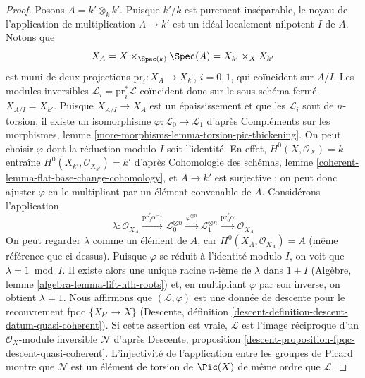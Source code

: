 \begin{proof}
\medskip\noindent
Posons $A = k' \otimes_k k'$. Puisque $k'/k$ est purement inséparable,
le noyau de l'application de multiplication $A \to k'$ est un
idéal localement nilpotent $I$ de $A$. Notons que
$$
X_A = X \times_{\Spec(k)} \Spec(A) = X_{k'} \times_X X_{k'}
$$
est muni de deux projections $\text{pr}_i : X_A \to X_{k'}$, $i = 0, 1$,
qui coïncident sur $A/I$. Les modules inversibles
$\mathcal{L}_i = \text{pr}_i^*\mathcal{L}$
coïncident donc sur le sous-schéma fermé $X_{A/I} = X_{k'}$.
Puisque $X_{A/I} \to X_A$ est un épaississement et que
les $\mathcal{L}_i$ sont de $n$-torsion, il
existe un isomorphisme $\varphi : \mathcal{L}_0 \to \mathcal{L}_1$ d'après
Compléments sur les morphismes, lemme \ref{more-morphisms-lemma-torsion-pic-thickening}.
On peut choisir $\varphi$ dont la réduction modulo $I$ soit l'identité. En effet,
$H^0(X, \mathcal{O}_X) = k$ entraîne
$H^0(X_{k'}, \mathcal{O}_{X_{k'}}) = k'$ d'après
Cohomologie des schémas, lemme \ref{coherent-lemma-flat-base-change-cohomology},
et $A \to k'$ est surjective ; on peut donc ajuster $\varphi$ en le multipliant par
un élément convenable de $A$. Considérons l'application
$$
\lambda : \mathcal{O}_{X_A}
\xrightarrow{\text{pr}_0^*\alpha^{-1}}
\mathcal{L}_0^{\otimes n}
\xrightarrow{\varphi^{\otimes n}}
\mathcal{L}_1^{\otimes n}
\xrightarrow{\text{pr}_0^*\alpha}
\mathcal{O}_{X_A}
$$
On peut regarder $\lambda$ comme un élément de $A$, car
$H^0(X_A, \mathcal{O}_{X_A}) = A$ (même référence que ci-dessus).
Puisque $\varphi$ se réduit à l'identité modulo $I$, on
voit que $\lambda = 1 \bmod I$. Il existe alors une unique
racine $n$-ième de $\lambda$ dans $1 + I$
(Algèbre, lemme \ref{algebra-lemma-lift-nth-roots})
et, en multipliant $\varphi$ par son inverse, on obtient $\lambda = 1$.
Nous affirmons que $(\mathcal{L}, \varphi)$ est une donnée de descente
pour le recouvrement fpqc $\{X_{k'} \to X\}$
(Descente, définition \ref{descent-definition-descent-datum-quasi-coherent}).
Si cette assertion est vraie, $\mathcal{L}$ est l'image réciproque d'un
$\mathcal{O}_X$-module inversible $\mathcal{N}$ d'après
Descente, proposition \ref{descent-proposition-fpqc-descent-quasi-coherent}.
L'injectivité de l'application entre les groupes de Picard montre que $\mathcal{N}$
est un élément de torsion de $\Pic(X)$ de même ordre que $\mathcal{L}$.


\end{proof}

